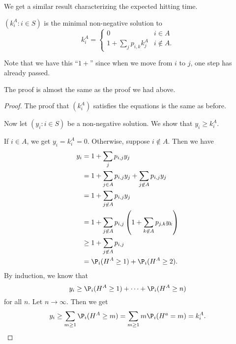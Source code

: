 \documentclass[a4paper]{article}
\begin{document}
We get a similar result characterizing the expected hitting time.
\begin{thm}
  $(k_i^A: i \in S)$ is the minimal non-negative solution to
  \[
    k_i^A =
    \begin{cases}
      0 & i \in A\\
      1 + \sum_j p_{i, k}k_j^A & i \not\in A.
    \end{cases}
  \]
\end{thm}
Note that we have this ``$1 +$'' since when we move from $i$ to $j$, one step has already passed.

The proof is almost the same as the proof we had above.
\begin{proof}
  The proof that $(k_i^A)$ satisfies the equations is the same as before.

  Now let $(y_i : i\in S)$ be a non-negative solution. We show that $y_i \geq k_i^A$.

  If $i \in A$, we get $y_i = k_i^A = 0$. Otherwise, suppose $i\not\in A$. Then we have
  \begin{align*}
    y_i &= 1 + \sum_j p_{i, j}y_j\\
    &= 1 + \sum_{j \in A}p_{i, j}y_j + \sum_{j\not\in A}p_{i, j}y_j\\
    &= 1 + \sum_{j\not\in A}p_{i, j}y_j\\
    &= 1 + \sum_{j \not\in A}p_{i, j}\left(1 + \sum_{k\not\in A} p_{j, k}y_k\right)\\
    &\geq 1 + \sum_{j \not\in A} p_{i, j}\\
    &= \P_i(H^A \geq 1) + \P_i(H^A \geq 2).
  \end{align*}
  By induction, we know that
  \[
    y_i \geq \P_i (H^A \geq 1) + \cdots + \P_i(H^A \geq n)
  \]
  for all $n$. Let $n\to \infty$. Then we get
  \[
    y_i \geq \sum_{m \geq 1}\P_i(H^A \geq m) = \sum_{m \geq 1} m\P_i(H^a = m)= k_i^A.\qedhere
  \]
\end{proof}
\end{document}
